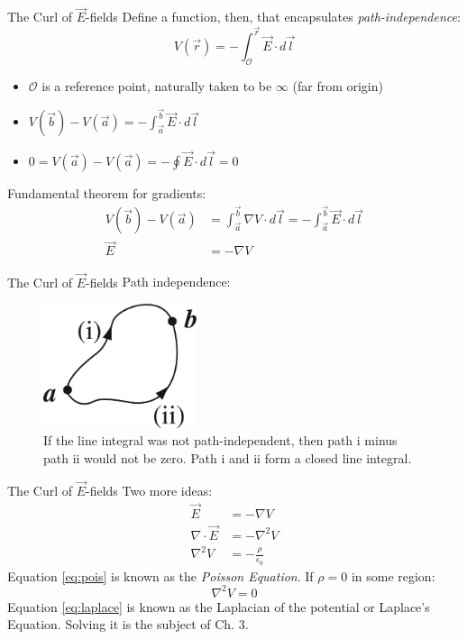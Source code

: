 \documentclass{beamer}
\begin{document}
\begin{frame}{The Curl of $\vec{E}$-fields}
\small
Define a function, then, that encapsulates \textit{path-independence}:
\begin{equation}
V(\vec{r}) = -\int_{\mathcal{O}}^{\vec{r}} \vec{E} \cdot d\vec{l}
\end{equation}
\begin{itemize}
\item $\mathcal{O}$ is a reference point, naturally taken to be $\infty$ (far from origin)
\item $V(\vec{b}) - V(\vec{a}) = -\int_{\vec{a}}^{\vec{b}} \vec{E} \cdot d\vec{l}$
\item $0 = V(\vec{a}) - V(\vec{a}) = -\oint \vec{E} \cdot d\vec{l} = 0$
\end{itemize}
Fundamental theorem for gradients:
\begin{align}
V(\vec{b}) - V(\vec{a}) &= \int_{\vec{a}}^{\vec{b}} \nabla V \cdot d\vec{l} = -\int_{\vec{a}}^{\vec{b}} \vec{E} \cdot d\vec{l} \\
\vec{E} &= -\nabla V
\end{align}
\end{frame}

\begin{frame}{The Curl of $\vec{E}$-fields}
\small
Path independence:
\begin{figure}
\centering
\includegraphics[width=4.5cm]{figures/2_30.jpg}
\caption{\label{fig:path1} If the line integral was not path-independent, then path i minus path ii would not be zero.  Path i and ii form a closed line integral.}
\end{figure}
\end{frame}

\begin{frame}{The Curl of $\vec{E}$-fields}
\small
Two more ideas:
\begin{align}
\vec{E} &= -\nabla V \\
\nabla \cdot \vec{E} &= - \nabla^2 V \\
\nabla^2 V &= -\frac{\rho}{\epsilon_0} \label{eq:pois}
\end{align}
Equation \ref{eq:pois} is known as the \textit{Poisson Equation}.  If $\rho = 0$ in some region:
\begin{equation}
\boxed{
\nabla^2 V = 0 \label{eq:laplace}
}
\end{equation}
Equation \ref{eq:laplace} is known as the Laplacian of the potential or Laplace's Equation.  Solving it is the subject of Ch. 3.
\end{frame}
\end{document}
